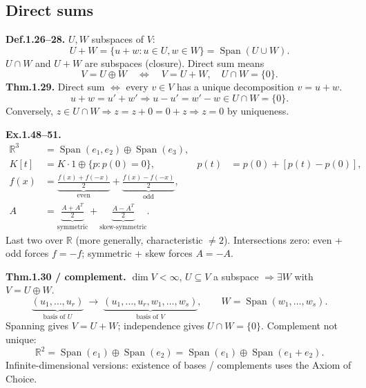 \documentclass[11pt,letterpaper]{article}
\begin{document}
\newpage

\subsection{Direct sums}\label{direct-sums}

\textbf{Def.1.26--28.} \(U,W\) subspaces of \(V\): \[
U+W=\{u+w:u\in U,w\in W\}=\operatorname{Span}(U\cup W).
\] \(U\cap W\) and \(U+W\) are subspaces (closure). Direct sum means \[
V=U\oplus W\quad\iff\quad V=U+W,\quad U\cap W=\{0\}.
\] \textbf{Thm.1.29.} Direct sum \(\iff\) every \(v\in V\) has a unique
decomposition \(v=u+w\). \[
u+w=u'+w'\Rightarrow u-u'=w'-w\in U\cap W=\{0\}.
\] Conversely, \(z\in U\cap W\Rightarrow z=z+0=0+z\Rightarrow z=0\) by
uniqueness.

\textbf{Ex.1.48--51.} \[
\begin{aligned}
\mathbb R^3&=\operatorname{Span}(e_1,e_2)\oplus\operatorname{Span}(e_3),\\
K[t]&=K\cdot1\oplus\{p:p(0)=0\},
&p(t)&=p(0)+[p(t)-p(0)],\\
f(x)&=\underbrace{\frac{f(x)+f(-x)}2}_{\text{even}}
+\underbrace{\frac{f(x)-f(-x)}2}_{\text{odd}},\\
A&=\underbrace{\frac{A+A^T}2}_{\text{symmetric}}
+\underbrace{\frac{A-A^T}2}_{\text{skew-symmetric}}.
\end{aligned}
\] Last two over \(\mathbb R\) (more generally, characteristic
\(\ne2\)). Intersections zero: even + odd forces \(f=-f\); symmetric +
skew forces \(A=-A\).

\textbf{Thm.1.30 / complement.} \(\dim V<\infty\), \(U\subseteq V\) a
subspace \(\Rightarrow\exists W\) with \(V=U\oplus W\). \[
\underbrace{(u_1,\ldots,u_r)}_{\text{basis of }U}
\ \longrightarrow\
\underbrace{(u_1,\ldots,u_r,w_1,\ldots,w_s)}_{\text{basis of }V},
\qquad W=\operatorname{Span}(w_1,\ldots,w_s).
\] Spanning gives \(V=U+W\); independence gives \(U\cap W=\{0\}\).
Complement not unique: \[
\mathbb R^2=\operatorname{Span}(e_1)\oplus\operatorname{Span}(e_2)
=\operatorname{Span}(e_1)\oplus\operatorname{Span}(e_1+e_2).
\] Infinite-dimensional versions: existence of bases / complements uses
the Axiom of Choice.
\end{document}
